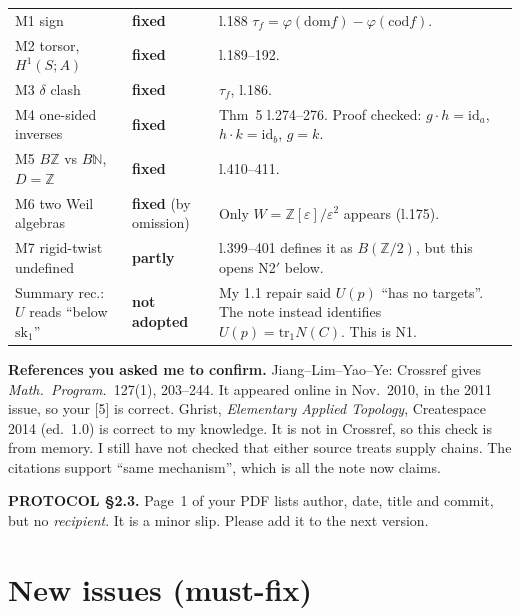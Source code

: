 \documentclass[11pt]{article}
\newcommand{\Z}{\mathbb{Z}}
\newcommand{\N}{\mathbb{N}}
\begin{document}
\begin{longtable}{p{2.6cm}p{1.9cm}p{10.6cm}}
M1 sign & \textbf{fixed} & l.188 $\tau_f=\varphi(\mathrm{dom}f)-\varphi(\mathrm{cod}f)$.\\
M2 torsor, $H^1(S;A)$ & \textbf{fixed} & l.189--192.\\
M3 $\delta$ clash & \textbf{fixed} & $\tau_f$, l.186.\\
M4 one-sided inverses & \textbf{fixed} & Thm~5 l.274--276. Proof checked: $g\cdot h=\mathrm{id}_a$, $h\cdot k=\mathrm{id}_b$, $g=k$.\\
M5 $B\Z$ vs $B\N$, $D=\Z$ & \textbf{fixed} & l.410--411.\\
M6 two Weil algebras & \textbf{fixed} (by omission) & Only $W=\Z[\varepsilon]/\varepsilon^2$ appears (l.175).\\
M7 rigid-twist undefined & \textbf{partly} & l.399--401 defines it as $B(\Z/2)$, but this opens N2$'$ below.\\
Summary rec.: $U$ reads ``below $\mathrm{sk}_1$'' & \textbf{not adopted} & My 1.1 repair said $U(p)$ ``has no targets''. The note instead identifies $U(p)=\mathrm{tr}_1N(C)$. This is N1.\\
\bottomrule
\end{longtable}

\textbf{References you asked me to confirm.} Jiang--Lim--Yao--Ye: Crossref gives \emph{Math.\
Program.}\ 127(1), 203--244. It appeared online in Nov.\ 2010, in the 2011 issue, so your [5] is
correct. Ghrist, \emph{Elementary Applied Topology}, Createspace 2014 (ed.\ 1.0) is correct to my
knowledge. It is not in Crossref, so this check is from memory. I still have not checked that
either source treats supply chains. The citations support ``same mechanism'', which is all the
note now claims.

\textbf{PROTOCOL \S2.3.} Page~1 of your PDF lists author, date, title and commit, but no
\emph{recipient}. It is a minor slip. Please add it to the next version.

\section{New issues (must-fix)}
\end{document}
